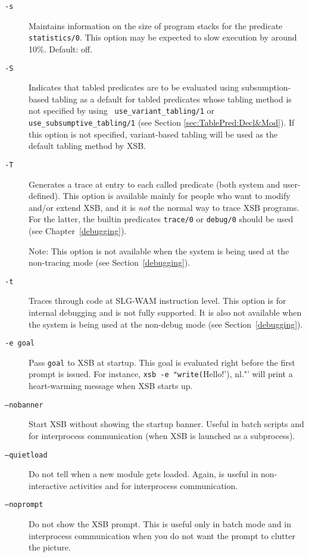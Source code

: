 \begin{description}
%
\item[{\tt -s}] Maintains information on the size of program stacks 
    for the predicate {\tt statistics/0}.  This option may be expected
    to slow execution by around 10\%.  Default: off.
\item[{\tt -S}] Indicates that tabled predicates are to be evaluated
    using subsumption-based tabling as a default for tabled predicates
    whose tabling method is not specified by using {\tt
    use\_variant\_tabling/1} or {\tt use\_subsumptive\_tabling/1} (see
    Section \ref{sec:TablePred:Decl&Mod}).  If this option is not
    specified, variant-based tabling will be used as the default tabling
    method by XSB\@.
\item[{\tt -T}] Generates a trace at entry to each called predicate
    (both system and user-defined).  This option is available mainly
    for people who want to modify and/or extend XSB, and it is
    {\em not\/} the normal way to trace XSB programs.  For the
    latter, the builtin predicates {\tt trace/0} or {\tt debug/0}
    should be used (see Chapter~\ref{debugging}).

    Note: This option is not available when the system is being used
    at the non-tracing mode (see Section~\ref{debugging}).
\item[{\tt -t}] Traces through code at SLG-WAM instruction level.  This
    option is for internal debugging and is not fully supported.
    It is also not available when the system is being used at the non-debug
    mode (see Section~\ref{debugging}).
\item[{\tt -e goal}] Pass {\tt goal}  to XSB at startup. This goal is evaluated
    right before the first prompt is issued. For instance, 
    \verb'xsb -e "write('Hello!'), nl."'
    will print a heart-warming message when XSB starts up.
  \item[{\tt --nobanner}] Start XSB without showing the startup banner.
    Useful in batch scripts and for interprocess communication (when XSB is
    launched as a subprocess).
  \item[{\tt --quietload}] Do not tell when a new module gets loaded. Again, is
    useful in non-interactive activities and for interprocess communication.
  \item[{\tt --noprompt}] Do not show the XSB prompt. This is useful only in batch
    mode and in interprocess communication when you do not want the prompt
    to clutter the picture.
\end{description}


